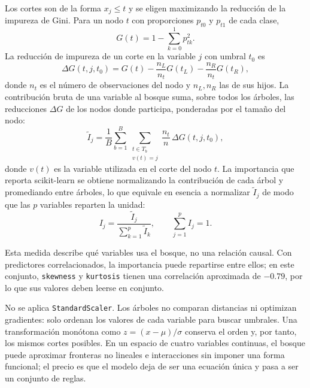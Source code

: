 \documentclass[conference]{IEEEtran}
\begin{document}
    Los cortes son de la forma $x_j\le t$ y se eligen maximizando la reducción de la impureza de Gini. Para un nodo $t$ con proporciones $p_{t0}$ y $p_{t1}$ de cada clase,
    \begin{equation}
    	G(t)=1-\sum_{k=0}^{1}p_{tk}^{2}.
    	\label{eq:gini}
    \end{equation}
    La reducción de impureza de un corte en la variable $j$ con umbral $t_0$ es
    \begin{equation}
    	\Delta G(t,j,t_0)=G(t)-\frac{n_L}{n_t}G(t_L)-\frac{n_R}{n_t}G(t_R),
    	\label{eq:delta-gini}
    \end{equation}
    donde $n_t$ es el número de observaciones del nodo y $n_L,n_R$ las de sus hijos. La contribución bruta de una variable al bosque suma, sobre todos los árboles, las reducciones $\Delta G$ de los nodos donde participa, ponderadas por el tamaño del nodo:
    \begin{equation}
    	\tilde{I}_j=\frac{1}{B}\sum_{b=1}^{B}\sum_{\substack{t\in T_b\\ v(t)=j}}
    	\frac{n_t}{n}\,\Delta G(t,j,t_0),
    	\label{eq:rf-importance-raw}
    \end{equation}
    donde $v(t)$ es la variable utilizada en el corte del nodo $t$.
    La importancia que reporta scikit-learn se obtiene normalizando la contribución de cada árbol y promediando entre árboles, lo que equivale en esencia a normalizar $\tilde{I}_j$ de modo que las $p$ variables reparten la unidad:
    \begin{equation}
    	I_j=\frac{\tilde{I}_j}{\sum_{k=1}^{p}\tilde{I}_k},
    	\qquad \sum_{j=1}^{p}I_j=1.
    	\label{eq:rf-importance}
    \end{equation}
    
    Esta medida describe qué variables usa el bosque, no una relación causal. Con predictores correlacionados, la importancia puede repartirse entre ellos; en este conjunto, \texttt{skewness} y \texttt{kurtosis} tienen una correlación aproximada de $-0.79$, por lo que sus valores deben leerse en conjunto.
    
    No se aplica \texttt{StandardScaler}. Los árboles no comparan distancias ni optimizan gradientes: solo ordenan los valores de cada variable para buscar umbrales. Una transformación monótona como $z=(x-\mu)/\sigma$ conserva el orden y, por tanto, los mismos cortes posibles. En un espacio de cuatro variables continuas, el bosque puede aproximar fronteras no lineales e interacciones sin imponer una forma funcional; el precio es que el modelo deja de ser una ecuación única y pasa a ser un conjunto de reglas.
\end{document}
